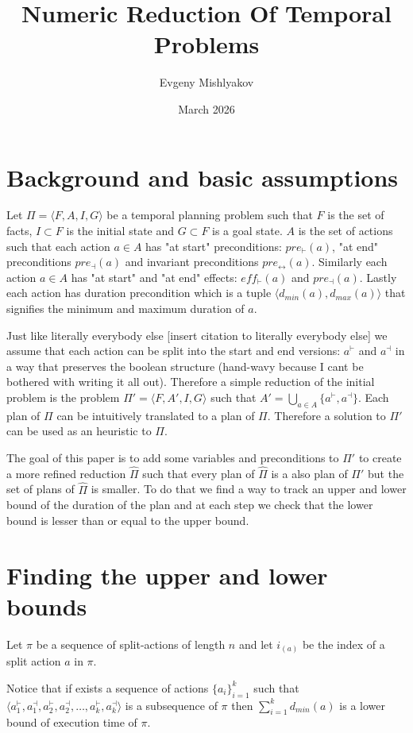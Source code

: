 \documentclass{article}
\title{Numeric Reduction Of Temporal Problems}
\author{Evgeny Mishlyakov}
\date{March 2026}
\begin{document}
\maketitle

\section{Background and basic assumptions}
Let $\Pi = \langle F,A,I,G \rangle$ be a temporal planning problem such that $F$ is the set of facts, $I\subset F$ is the initial state and $G\subset F$ is a goal state. $A$ is the set of actions such that each action $a\in A$ has "at start" preconditions: $pre_{\vdash}(a)$, "at end" preconditions $pre_{\dashv}(a)$ and invariant preconditions $pre_{\leftrightarrow}(a)$. Similarly each action $a \in A$ has "at start" and "at end" effects: $eff_{\vdash}(a)$  and $pre_{\dashv}(a)$. Lastly each action has duration precondition which is a tuple $\langle d_{min}(a), d_{max}(a)\rangle$ that signifies the minimum and maximum duration of $a$.

Just like literally everybody else [insert citation to literally everybody else] we assume that each action can be split into the start and end versions: $a^\vdash$ and $a^\dashv$ in a way that preserves the boolean structure (hand-wavy because I cant be bothered with writing it all out). Therefore a simple reduction of the initial problem is the problem $\Pi' = \langle F, A', I, G \rangle$ such that $A' = \bigcup_{a \in A} \{a^{\vdash}, a^\dashv\}$. Each plan of $\Pi$ can be intuitively translated to a plan of $\Pi$. Therefore a solution to $\Pi'$ can be used as an heuristic to $\Pi$. 

The goal of this paper is to add some variables and preconditions to $\Pi'$ to create a more refined reduction $\hat\Pi$ such that every plan of $\hat\Pi$ is a also plan of $\Pi'$ but the set of plans of $\hat\Pi$ is smaller. To do that we find a way to track an upper and lower bound of the duration of the plan and at each step we check that the lower bound is lesser than or equal to the upper bound.

\section{Finding the upper and lower bounds}
Let $\pi$ be a sequence of split-actions of length $n$ and let $i_(a)$ be the index of a split action $a$ in $\pi$. 

Notice that if exists a sequence of actions $\{a_i\}_{i=1}^k$ such that $\langle a_1^\vdash, a_1^\dashv, a_2^\vdash, a_2^\dashv, \dots, a_k^\vdash, a_k^\dashv\rangle$ is a subsequence of $\pi$ then $\sum_{i=1}^k d_{min}(a)$ is a lower bound of execution time of $\pi$.
\end{document}
